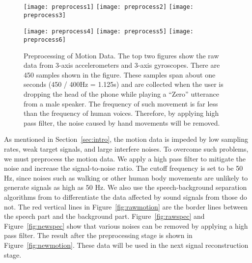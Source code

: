 \begin{figure}[H]
	\begin{minipage}[t]{.45\linewidth}
		\centering
		\texttt{[image: preprocess1]}
		\texttt{[image: preprocess2]}
		\vspace{-.2in}
		\label{fig:rawmotion}
		\vspace{.2in}
		\texttt{[image: preprocess3]}
		\vspace{-.2in}
		\label{fig:rawspec}
	\end{minipage}
	\begin{minipage}[t]{.05\linewidth}
		\quad
	\end{minipage}
	\begin{minipage}[t]{.45\linewidth}
		\centering
		\texttt{[image: preprocess4]}
		\vspace{-.2in}
		\label{fig:newspec}
		\vspace{.2in}
		\texttt{[image: preprocess5]}
		\texttt{[image: preprocess6]}
		\vspace{-.2in}
		\label{fig:newmotion}
	\end{minipage}
	
	\caption[Preprocessing of Motion Data. ]{Preprocessing of Motion Data. The top two figures show the raw data from 3-axis accelerometers and 3-axis gyroscopes. There are 450 samples shown in the figure. These samples span about one seconds (450 / 400Hz = 1.125s) and are collected when the user is  dropping the head of the phone while playing a ``Zero'' utterance from a male speaker. The frequency of such movement is far less than the frequency of human voices. Therefore, by applying high pass filter, the noise caused by hand movements will be removed. }
	
	\label{fig:spyphonepreprocess}
\end{figure}

As mentioned in Section~\ref{sec:intro}, the motion data is impeded by low sampling rates, weak target signals, and large interfere noises. To overcome such problems, we must preprocess the motion data. We apply a high pass filter to mitigate the noise and increase the signal-to-noise ratio. The cutoff frequency is set to be 50 Hz, since noises such as walking or other human body movements are unlikely to generate signals as high as 50 Hz.
We also use the speech-background separation algorithms from \cite{rabiner2011theory} to differentiate the data affected by sound signals from those do not. The red vertical lines in Figure~\ref{fig:rawmotion} are the border lines between the speech part and the background part. 
Figure~\ref{fig:rawspec} and Figure~\ref{fig:newspec} show that various noises can be removed by applying a high pass filter.
The result after the preprocessing stage is shown in Figure~\ref{fig:newmotion}. These data will be used in the next signal reconstruction stage.



